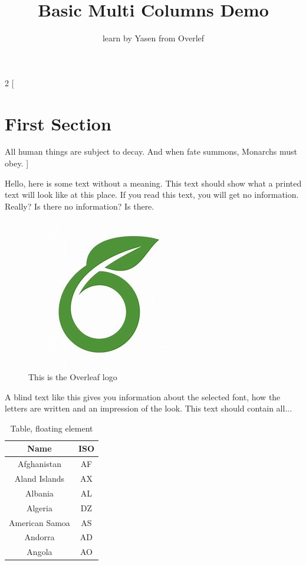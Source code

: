 \documentclass[]{report}
\title{Basic Multi Columns Demo}
\author{learn by Yasen from Overlef}
\begin{document}
	
	\begin{multicols}{2}
		[
		\section{First Section}
		All human things are subject to decay. And when fate summons, Monarchs must obey.
		]
		
		Hello, here is some text without a meaning.  This text should show what 
		a printed text will look like at this place.
		If you read this text, you will get no information.  Really?  Is there 
		no information?  Is there.
		
		\vfill
		
		\begin{figure}
			\includegraphics[width=\linewidth]{overleaf}
			\caption{This is the Overleaf logo}
		\end{figure}
		
		A blind text like this gives you information about the selected font, how 
		the letters are written and an impression of the look.  This text should
		contain all...
		
		
		
		\begin{table}
			\centering
			\begin{tabular}{|c|c|}
				\hline
				Name & ISO \\
				\hline
				Afghanistan & AF \\
				Aland Islands & AX \\
				Albania    &AL  \\
				Algeria   &DZ \\
				American Samoa & AS \\
				Andorra & AD   \\
				Angola & AO \\
				\hline
			\end{tabular}
			\caption{Table, floating element}
			\label{table:ta}
		\end{table}
		
		
		\blindtext\blindtext
		
	\end{multicols}
	
\end{document}
